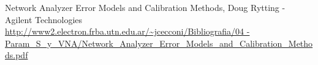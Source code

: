 \begin{thebibliography}{1}

  Network Analyzer Error Models and Calibration Methods, Doug Rytting - Agilent Technologies\\
  \href{http://www2.electron.frba.utn.edu.ar/~jcecconi/Bibliografia/04 - Param\_S\_y\_VNA/Network\_Analyzer\_Error\_Models\_and\_Calibration\_Methods.pdf}{\url{http://www2.electron.frba.utn.edu.ar/~jcecconi/Bibliografia/04 - Param\_S\_y\_VNA/Network\_Analyzer\_Error\_Models\_and\_Calibration\_Methods.pdf}}

\end{thebibliography}
\newpage